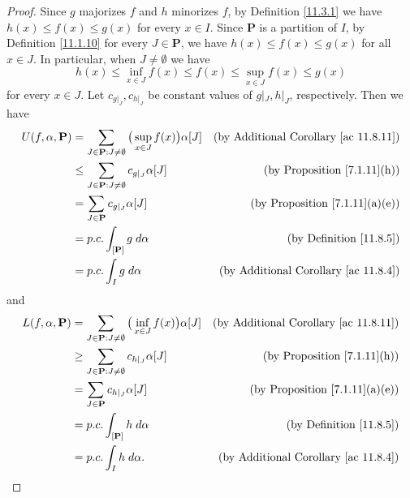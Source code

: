 \begin{proof}
    Since \(g\) majorizes \(f\) and \(h\) minorizes \(f\), by Definition \ref{11.3.1} we have \(h(x) \leq f(x) \leq g(x)\) for every \(x \in I\).
    Since \(\mathbf{P}\) is a partition of \(I\), by Definition \ref{11.1.10} for every \(J \in \mathbf{P}\), we have \(h(x) \leq f(x) \leq g(x)\) for all \(x \in J\).
    In particular, when \(J \neq \emptyset\) we have
    \[
        h(x) \leq \inf_{x \in J} f(x) \leq f(x) \leq \sup_{x \in J} f(x) \leq g(x)
    \]
    for every \(x \in J\).
    Let \(c_{g|_J}, c_{h|_J}\) be constant values of \(g|_J, h|_J\), respectively.
    Then we have
    \begin{align*}
        U(f, \alpha, \mathbf{P}) & = \sum_{J \in \mathbf{P} : J \neq \emptyset} \big(\sup_{x \in J} f(x)\big) \alpha[J] & \text{(by Additional Corollary \ref{ac 11.8.11})} \\
                                 & \leq \sum_{J \in \mathbf{P} : J \neq \emptyset} c_{g|_J} \alpha[J]                   & \text{(by Proposition \ref{7.1.11}(h))}           \\
                                 & = \sum_{J \in \mathbf{P}} c_{g|_J} \alpha[J]                                         & \text{(by Proposition \ref{7.1.11}(a)(e))}        \\
                                 & = p.c. \int_{[\mathbf{P}]} g \; d \alpha                                             & \text{(by Definition \ref{11.8.5})}               \\
                                 & = p.c. \int_I g \; d \alpha                                                          & \text{(by Additional Corollary \ref{ac 11.8.4})}
    \end{align*}
    and
    \begin{align*}
        L(f, \alpha, \mathbf{P}) & = \sum_{J \in \mathbf{P} : J \neq \emptyset} \big(\inf_{x \in J} f(x)\big) \alpha[J] & \text{(by Additional Corollary \ref{ac 11.8.11})} \\
                                 & \geq \sum_{J \in \mathbf{P} : J \neq \emptyset} c_{h|_J} \alpha[J]                   & \text{(by Proposition \ref{7.1.11}(h))}           \\
                                 & = \sum_{J \in \mathbf{P}} c_{h|_J} \alpha[J]                                         & \text{(by Proposition \ref{7.1.11}(a)(e))}        \\
                                 & = p.c. \int_{[\mathbf{P}]} h \; d \alpha                                             & \text{(by Definition \ref{11.8.5})}               \\
                                 & = p.c. \int_I h \; d \alpha.                                                         & \text{(by Additional Corollary \ref{ac 11.8.4})}
    \end{align*}
\end{proof}

